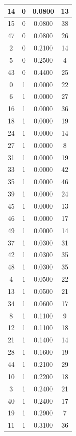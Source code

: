 \documentclass[twoside, 10pt]{article}
\begin{document}
\begin{itemize}
\begin{table}[htpb]
\begin{tabular}{|c|c|c|c|}
    \hline
    14 & 0 & 0.0800 & 13 \\
    \hline
    15 & 0 & 0.0800 & 38 \\
    \hline
    47 & 0 & 0.0800 & 26 \\
    \hline
    2 & 0 & 0.2100 & 14 \\
    \hline
    5 & 0 & 0.2500 & 4 \\
    \hline
    43 & 0 & 0.4400 & 25 \\
    \hline
    0 & 1 & 0.0000 & 22 \\
    \hline
    6 & 1 & 0.0000 & 27 \\
    \hline
    16 & 1 & 0.0000 & 36 \\
    \hline
    18 & 1 & 0.0000 & 19 \\
    \hline
    24 & 1 & 0.0000 & 14 \\
    \hline
    27 & 1 & 0.0000 & 8 \\
    \hline
    31 & 1 & 0.0000 & 19 \\
    \hline
    33 & 1 & 0.0000 & 42 \\
    \hline
    35 & 1 & 0.0000 & 46 \\
    \hline
    39 & 1 & 0.0000 & 24 \\
    \hline
    45 & 1 & 0.0000 & 13 \\
    \hline
    46 & 1 & 0.0000 & 17 \\
    \hline
    49 & 1 & 0.0000 & 14 \\
    \hline
    37 & 1 & 0.0300 & 31 \\
    \hline
    42 & 1 & 0.0300 & 35 \\
    \hline
    48 & 1 & 0.0300 & 35 \\
    \hline
    4 & 1 & 0.0500 & 22 \\
    \hline
    13 & 1 & 0.0500 & 21 \\
    \hline
    34 & 1 & 0.0600 & 17 \\
    \hline
    8 & 1 & 0.1100 & 9 \\
    \hline
    12 & 1 & 0.1100 & 18 \\
    \hline
    21 & 1 & 0.1400 & 14 \\
    \hline
    28 & 1 & 0.1600 & 19 \\
    \hline
    44 & 1 & 0.2100 & 29 \\
    \hline
    10 & 1 & 0.2200 & 18 \\
    \hline
    3 & 1 & 0.2400 & 21 \\
    \hline
    40 & 1 & 0.2400 & 17 \\
    \hline
    19 & 1 & 0.2900 & 7 \\
    \hline
    11 & 1 & 0.3100 & 36 \\
    \hline
    \end{tabular}
    \end{table}
\end{itemize}
\end{document}
